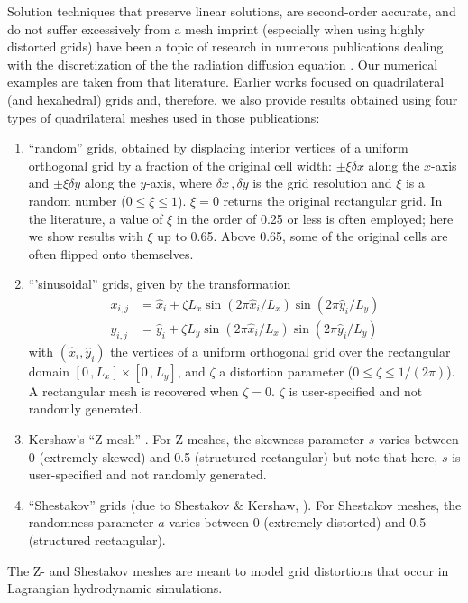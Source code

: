 \documentclass[preprint,10pt]{elsarticle}
\begin{document}
Solution techniques that preserve linear solutions, are 
second-order accurate, and do not suffer excessively from a mesh imprint (especially when using highly
distorted grids) have been a topic of research in numerous publications dealing with the discretization of the
the radiation diffusion equation . Our numerical examples
are taken from that literature. Earlier works focused on quadrilateral (and hexahedral) grids
\cite{Morel1992,MorelRobertsShashkov1998,MorelHallShashkov2001,Palmer2001} and, therefore, 
we also provide results obtained using four types of quadrilateral meshes used in those publications: 
\begin{enumerate}
\item 
``random'' grids, obtained by displacing interior vertices of a uniform orthogonal grid by a fraction
of the original cell width: $\pm\xi\delta x$ along 
the $x$-axis and $\pm\xi\delta y$ along the $y$-axis, where $\delta x\,,\delta y$ is the grid resolution 
and $\xi$ is a random number ($0 \le \xi \le 1$). $\xi=0$ returns the original rectangular grid. In 
the literature, a value of $\xi$ in the order of 0.25 or less is often employed; here we show results with $\xi$ up to 0.65. 
Above 0.65, some of the original cells are often flipped onto themselves. 
\item
 ``'sinusoidal'' grids, given by the transformation
\begin{align*}
x_{i,j} &= \hat x_i + \zeta L_x \sin\left(2\pi \hat x_i/L_x \right) \sin\left(2\pi \hat y_i/L_y \right) \\
y_{i,j} &= \hat y_i + \zeta L_y \sin\left(2\pi \hat x_i/L_x \right) \sin\left(2\pi \hat y_i/L_y \right) 
\end{align*}
with $(\hat x_i, \hat y_i)$ the vertices of a uniform orthogonal grid over the rectangular domain 
$[0\, , L_x]\times [0\, , L_y]$, and $\zeta$ a distortion parameter ($0\le \zeta \le 1/(2\pi)$). 
A rectangular mesh is recovered when $\zeta=0$. $\zeta$ is user-specified and not randomly generated.
\item
Kershaw's ``Z-mesh'' \cite{Kershaw1981}.  
For Z-meshes, the skewness parameter $s$ varies between 0 (extremely skewed) and 0.5 (structured rectangular)
but note that here, $s$ is user-specified and not randomly generated.
\item 
``Shestakov'' grids (due to Shestakov \& Kershaw, \cite{Shestakov1988,Sheshakov1990}).
For Shestakov meshes, the randomness parameter $a$ varies between 0 (extremely distorted) 
and 0.5 (structured rectangular).
\end{enumerate}
The Z- and Shestakov meshes are meant to model grid distortions that occur in Lagrangian hydrodynamic 
simulations. 
\end{document}
